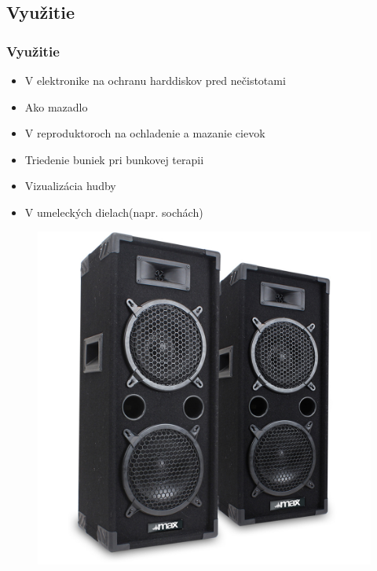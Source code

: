 \documentclass[dvipsnames]{beamer}
\begin{document}
\begin{frame}
	\section{Využitie}
	\frametitle{Využitie}
	\begin{itemize}
		\item V elektronike na ochranu harddiskov pred nečistotami
		\item Ako mazadlo
		\item V reproduktoroch na ochladenie a mazanie cievok
		\item Triedenie buniek pri bunkovej terapii
		\item Vizualizácia hudby
		\item V umeleckých dielach(napr. sochách)
	\end{itemize}
	\begin{figure}
		\includegraphics[scale=.1]{repr}
	\end{figure}
\end{frame}
\end{document}
